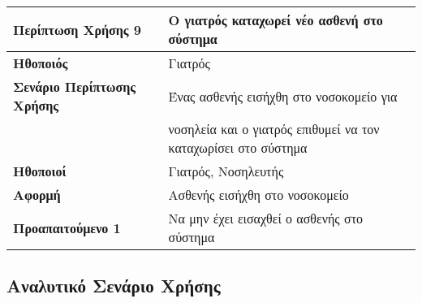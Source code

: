 \documentclass{article}
\newcommand\T{\rule{0pt}{2.6ex}}       %
\newcommand\B{\rule[-1.2ex]{0pt}{0pt}}
\begin{document}
\begin{center}
     \begin{tabular}{|l|l|}
     \hline
      \textbf{Περίπτωση Χρήσης 9} & Ο γιατρός καταχωρεί νέο ασθενή στο σύστημα \T\B \\ 
      \hline
      \textbf{Ηθοποιός} & Γιατρός \T\B \\
      \hline
      \textbf{Σενάριο Περίπτωσης Χρήσης} & Ένας ασθενής εισήχθη στο νοσοκομείο για   \T \\& νοσηλεία και ο γιατρός επιθυμεί να τον καταχωρίσει στο σύστημα \\
      \hline
      \textbf{Ηθοποιοί} & Γιατρός, Νοσηλευτής \T\B \\
      \hline
      \textbf{Αφορμή} &  Ασθενής εισήχθη στο νοσοκομείο\T\B \\
      \hline
      \textbf{Προαπαιτούμενο 1} & Να μην έχει εισαχθεί ο ασθενής στο σύστημα \T\B \\
      \hline
     \end{tabular}
 \end{center}
 
 \subsection{Αναλυτικό Σενάριο Χρήσης}
 
\end{document}
